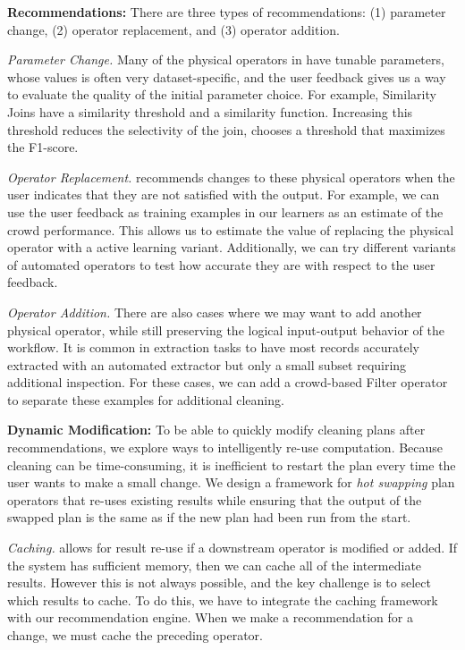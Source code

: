 {\noindent \bf Recommendations:} There are three types of recommendations: (1) parameter change, (2) operator replacement, and (3) operator addition.

\textit{Parameter Change.} Many of the physical operators in \sys have tunable parameters, whose values is often very dataset-specific, and the user feedback gives us a way to evaluate the quality of the initial parameter choice. 
For example, Similarity Joins have a similarity threshold and a similarity function. 
Increasing this threshold reduces the selectivity of the join, \sys chooses a threshold that maximizes the F1-score. 

\textit{Operator Replacement.} 
\sys recommends changes to these physical operators when the user indicates that they are not satisfied with the output.
For example, we can use the user feedback as training examples in our learners as an estimate of the crowd performance.
This allows us to estimate the value of replacing the physical operator with a active learning variant.
Additionally, we can try different variants of automated operators to test how accurate they are with respect to the user feedback.

\textit{Operator Addition.}  There are also cases where we may want to add another physical operator, while still preserving the logical input-output behavior of the workflow.
It is common in extraction tasks to have most records accurately extracted with an automated extractor but only a small subset requiring additional inspection. 
For these cases, we can add a crowd-based Filter operator to separate these examples for additional cleaning.

\vspace{.5em}

{\noindent \bf Dynamic Modification:} To be able to quickly modify cleaning plans after recommendations, we explore ways to intelligently re-use computation. Because cleaning can be time-consuming, it is inefficient to 
restart the plan every time the user wants to make a small change.
We design a framework for \emph{hot swapping} plan operators that re-uses existing results while ensuring that the output of the swapped plan is the same as if the new plan had been run from the start.

\textit{Caching.} allows for result re-use if a downstream operator is modified or added.
If the system has sufficient memory, then we can cache all of the intermediate results. 
However this is not always possible, and the key challenge is to select which results to cache.
To do this, we have to integrate the caching framework with our recommendation engine.
When we make a recommendation for a change, we must cache the preceding operator. 

